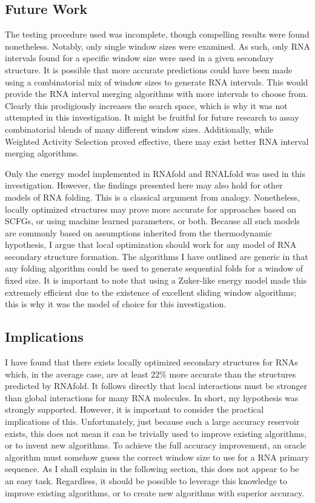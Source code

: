 \documentclass{cshonours}
\begin{document}
\subsection{Future Work}

The testing procedure used was incomplete, though compelling results were found nonetheless. Notably, only single window sizes were examined. As such, only RNA intervals found for a specific window size were used in a given secondary structure. It is possible that more accurate predictions could have been made using a combinatorial mix of window sizes to generate RNA intervals. This would provide the RNA interval merging algorithms with more intervals to choose from. Clearly this prodigiously increases the search space, which is why it was not attempted in this investigation. It might be fruitful for future research to assay combinatorial blends of many different window sizes. Additionally, while Weighted Activity Selection proved effective, there may exist better RNA interval merging algorithms.

Only the energy model implemented in RNAfold and RNALfold was used in this investigation. However, the findings presented here may also hold for other models of RNA folding. This is a classical argument from analogy. Nonetheless, locally optimized structures may prove more accurate for approaches based on SCFGs, or using machine learned parameters, or both. Because all such models are commonly based on assumptions inherited from the thermodynamic hypothesis, I argue that local optimization should work for any model of RNA secondary structure formation. The algorithms I have outlined are generic in that any folding algorithm could be used to generate sequential folds for a window of fixed size. It is important to note that using a Zuker-like energy model made this extremely efficient due to the existence of excellent sliding window algorithms; this is why it was the model of choice for this investigation.

\subsection{Implications}

I have found that there exists locally optimized secondary structures for RNAs which, in the average case, are at least 22\% more accurate than the structures predicted by RNAfold. It follows directly that local interactions must be stronger than global interactions for many RNA molecules. In short, my hypothesis was strongly supported. However, it is important to consider the practical implications of this. Unfortunately, just because such a large accuracy reservoir exists, this does not mean it can be trivially used to improve existing algorithms, or to invent new algorithms. To achieve the full accuracy improvement, an oracle algorithm must somehow guess the correct window size to use for a RNA primary sequence. As I shall explain in the following section, this does not appear to be an easy task. Regardless, it should be possible to leverage this knowledge to improve existing algorithms, or to create new algorithms with superior accuracy. 
\end{document}
